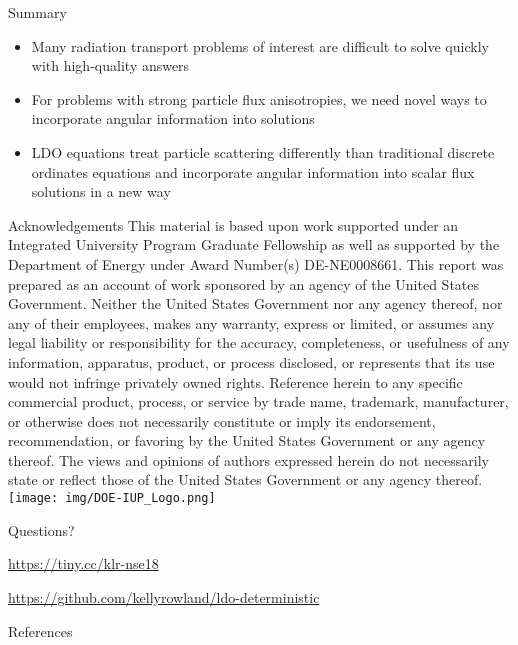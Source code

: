 \documentclass[handout]{beamer} %
\newcommand{\backupbegin}{
   \newcounter{framenumberappendix}
   \setcounter{framenumberappendix}{\value{framenumber}}
}
\newcommand{\backupend}{
   \addtocounter{framenumberappendix}{-\value{framenumber}}
   \addtocounter{framenumber}{\value{framenumberappendix}} 
}
\begin{document}
\begin{frame}{Summary}
%
\begin{itemize}
\item{Many radiation transport problems of interest are difficult to solve quickly with 
      high-quality answers}
\item{For problems with strong particle flux anisotropies, we need novel ways to incorporate
      angular information into solutions}
\item{LDO equations treat particle scattering differently than traditional discrete ordinates
      equations and incorporate angular information into scalar flux solutions in a new way}
\end{itemize}
%
\end{frame}

\begin{frame}{Acknowledgements}
\scriptsize
This material is based upon work supported under an Integrated
University Program Graduate Fellowship as well as supported by the Department 
of Energy under Award Number(s) DE-NE0008661. This report was prepared as an account 
of work sponsored by an agency of the United States Government. Neither the United 
States Government nor any agency thereof, nor any of their employees, makes any 
warranty, express or limited, or assumes any legal liability or responsibility for the 
accuracy, completeness, or usefulness of any information, apparatus, product, or
process disclosed, or represents that its use would not infringe privately owned
rights. Reference herein to any specific commercial product, process, or service by
trade name, trademark, manufacturer, or otherwise does not necessarily constitute or
imply its endorsement, recommendation, or favoring by the United States Government or
any agency thereof. The views and opinions of authors expressed herein do not 
necessarily state or reflect those of the United States Government or any agency 
thereof.
%
\centering
\texttt{[image: img/DOE-IUP\_Logo.png]}
%
\end{frame}

\begin{frame}
  \Large
  \begin{center}
  Questions?

  \vspace{\baselineskip}
  \url{https://tiny.cc/klr-nse18}
  
  \vspace{\baselineskip}
  \large
  \url{https://github.com/kellyrowland/ldo-deterministic}
  
  \end{center} 
\end{frame}

\backupbegin
\begin{frame}{References}
\printbibliography
\end{frame}
\backupend
\end{document}

